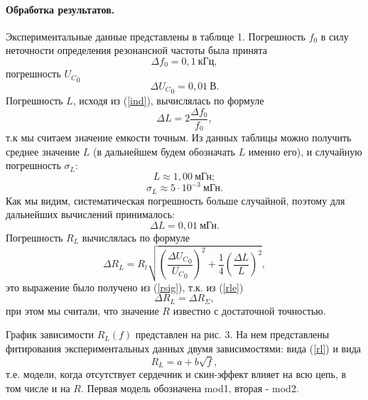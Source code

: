 \documentclass[12pt,a4paper]{article}
\begin{document}
\paragraph{Обработка результатов.} Экспериментальные данные представлены в таблице 1.
Погрешность $f_0$ в силу неточности определения резонансной частоты была принята
\begin{equation}
\Delta f_0 = 0,1~\text{кГц},
\end{equation}
погрешность ${U_C}_0$
\begin{equation}
\Delta {U_C}_0 = 0,01~\text{В}.
\end{equation}
Погрешность $L$, исходя из (\ref{ind}), вычислялась по формуле
\begin{equation}
\Delta L = 2\frac{\Delta f_0}{f_0}\label{dell},
\end{equation}
т.к мы считаем значение емкости точным. Из данных таблицы можно получить среднее значение $L$ (в дальнейшем будем обозначать $L$ именно его), и случайную погрешность $\sigma_L$:
\begin{equation}
L \approx 1,00~\text{мГн};
\end{equation}
\begin{equation}
\sigma_L \approx 5\cdot10^{-3}~\text{мГн}.
\end{equation}
Как мы видим, систематическая погрешность больше случайной, поэтому для дальнейших вычислений принималось:
\begin{equation}
\Delta L = 0,01~\text{мГн}.
\end{equation}
Погрешность $R_L$ вычислялась по формуле
\begin{equation}
\Delta R_L = R_l\sqrt{\left(\frac{\Delta {U_C}_0}{{U_C}_0}\right)^2 + \frac{1}{4}\left(\frac{\Delta L}{L}\right)^2},
\end{equation}
это выражение было получено из (\ref{rsig}), т.к. из (\ref{rle})
\begin{equation}
\Delta R_L = \Delta R_\Sigma,
\end{equation}
при этом мы считали, что значение $R$ известно с достаточной точностью.

График зависимости $R_L(f)$ представлен на рис. 3. На нем представлены фитирования экспериментальных данных двумя зависимостями: вида (\ref{rl}) и вида
\begin{equation}
R_L = a + b\sqrt{f},
\end{equation}
т.е. модели, когда отсутствует сердечник и скин-эффект влияет на всю цепь, в том числе и на $R$. Первая модель обозначена mod1, вторая - mod2.
\end{document}

